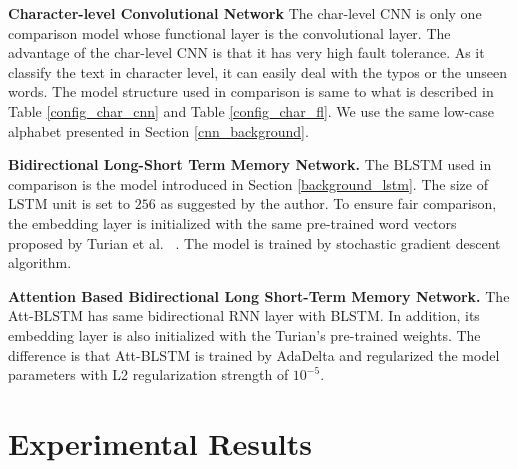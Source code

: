 \textbf{Character-level Convolutional Network}
The char-level CNN is only one comparison model whose functional layer is the convolutional layer. The advantage of the char-level CNN is that it has very high fault tolerance. As it classify the text in character level, it can easily deal with the typos or the unseen words. The model structure used in comparison is same to what is described in Table \ref{config_char_cnn} and Table \ref{config_char_fl}. We use the same low-case alphabet presented in Section \ref{cnn_background}.

\textbf{Bidirectional Long-Short Term Memory Network.}
The BLSTM used in comparison is the model introduced in Section \ref{background_lstm}. The size of LSTM unit is set to $256$ as suggested by the author. To ensure fair comparison, the embedding layer is initialized with the same pre-trained word vectors proposed by Turian et al. ~\cite{turian2010word}. The model is trained by stochastic gradient descent algorithm. 

\textbf{Attention Based Bidirectional Long Short-Term Memory Network.}
The Att-BLSTM has same bidirectional RNN layer with BLSTM. In addition, its embedding layer is also initialized with the Turian's pre-trained weights. The difference is that Att-BLSTM is trained by AdaDelta and regularized the model parameters with L2 regularization strength of $10^{-5}$.



\section{Experimental Results}
